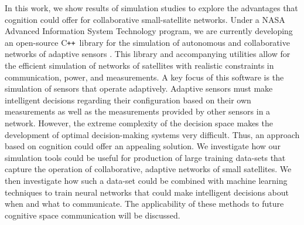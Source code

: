 \documentclass[conference]{IEEEtran}
\newcommand{\cpp}{C\texttt{++}~}
\begin{document}
In this work, we show results of simulation studies to explore the advantages that cognition could offer for collaborative small-satellite networks.  Under a NASA Advanced Information System Technology program, we are currently developing an open-source \cpp library for the simulation of autonomous and collaborative networks of adaptive sensors \cite{ref6}.  This library and accompanying utilities allow for the efficient simulation of networks of satellites with realistic constraints in communication, power, and measurements.  A key focus of this software is the simulation of sensors that operate adaptively.  Adaptive sensors must make intelligent decisions regarding their configuration based on their own measurements as well as the measurements provided by other sensors in a network.  However, the extreme complexity of the decision space makes the development of optimal decision-making systems very difficult.  Thus, an approach based on cognition could offer an appealing solution.
%
We investigate how our simulation tools could be useful for production of large training data-sets that capture the operation of collaborative, adaptive networks of small satellites.
We then investigate how such a data-set could be combined with machine learning techniques to train neural networks that could make intelligent decisions about when and what to communicate.
The applicability of these methods to future cognitive space communication will be discussed.

\end{document}
